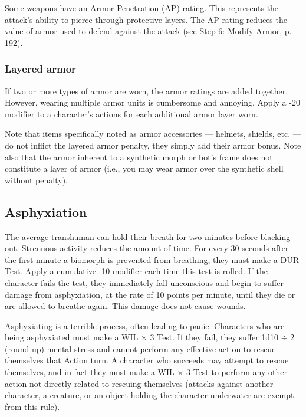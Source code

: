 Some weapons have an Armor Penetration (AP) rating. This represents the attack’s ability to pierce through protective layers. The AP rating reduces the value of armor used to defend against the attack (see Step 6: Modify Armor, p. 192).

\subsubsection{Layered armor}

If two or more types of armor are worn, the armor ratings are added together. However, wearing multiple armor units is cumbersome and annoying. Apply a -20 modifier to a character’s actions for each additional armor layer worn.

Note that items specifically noted as armor accessories --- helmets, shields, etc. --- do not inflict the layered armor penalty, they simply add their armor bonus. Note also that the armor inherent to a synthetic morph or bot’s frame does not constitute a layer of armor (i.e., you may wear armor over the synthetic shell without penalty).


\subsection{Asphyxiation}
\label{sec:asphyxiation}

The average transhuman can hold their breath for two minutes before blacking out. Strenuous activity reduces the amount of time. For every 30 seconds after the first minute a biomorph is prevented from breathing, they must make a DUR Test. Apply a cumulative -10 modifier each time this test is rolled. If the character fails the test, they immediately fall unconscious and begin to suffer damage from asphyxiation, at the rate of 10 points per minute, until they die or are allowed to breathe again. This damage does not cause wounds.

Asphyxiating is a terrible process, often leading to panic. Characters who are being asphyxiated must make a WIL $\times$ 3 Test. If they fail, they suffer 1d10 $\div$ 2 (round up) mental stress and cannot perform any effective action to rescue themselves that Action turn. A character who succeeds may attempt to rescue themselves, and in fact they must make a WIL $\times$ 3 Test to perform any other action not directly related to rescuing themselves (attacks against another character, a creature, or an object holding the character underwater are exempt from this rule).


